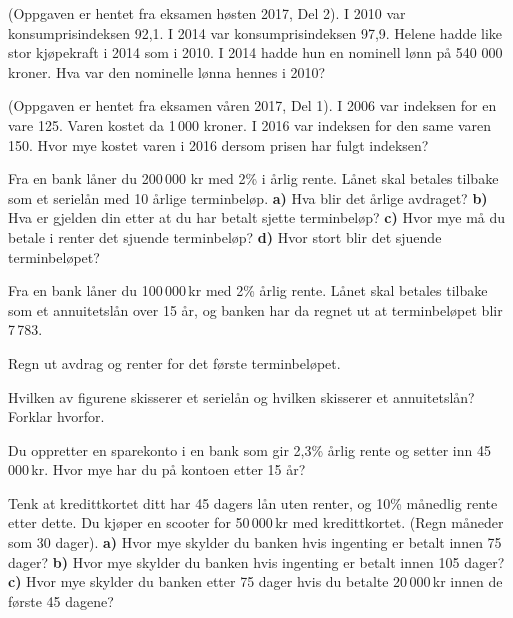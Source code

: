 (Oppgaven er hentet fra eksamen høsten 2017, Del 2).\os
I 2010 var konsumprisindeksen 92,1. I 2014 var konsumprisindeksen 97,9.
Helene hadde like stor kjøpekraft i 2014 som i 2010.
I 2014 hadde hun en nominell lønn på 540 000 kroner.
Hva var den nominelle lønna hennes i 2010?


(Oppgaven er hentet fra eksamen våren 2017, Del 1).\os
I 2006 var indeksen for en vare 125. Varen kostet da 1\,000 kroner. I 2016 var indeksen for den same varen 150.
Hvor mye kostet varen i 2016 dersom prisen har fulgt indeksen?

\nes

Fra en bank låner du 200\,000 kr med 2\% i årlig rente. Lånet skal betales tilbake som et serielån med 10 årlige terminbeløp. \os
\textbf{a)} Hva blir det årlige avdraget?\os
\textbf{b)} Hva er gjelden din etter at du har betalt sjette terminbeløp?\os
\textbf{c)} Hvor mye må du betale i renter det sjuende terminbeløp?\os
\textbf{d)} Hvor stort blir det sjuende terminbeløpet?\os 

Fra en bank låner du 100\,000\,kr med 2\% årlig rente. Lånet skal betales tilbake som et annuitetslån over 15 år, og banken har da regnet ut at terminbeløpet blir 7\,783.\os

Regn ut avdrag og renter for det første terminbeløpet.

Hvilken av figurene skisserer et serielån og hvilken skisserer et annuitetslån? Forklar hvorfor.
\begin{figure}	\centering
	\;
\end{figure}

Du oppretter en sparekonto i en bank som gir 2,3\% årlig rente og setter inn 45\,000\,kr. Hvor mye har du på kontoen etter 15 år?

Tenk at kredittkortet ditt har 45 dagers lån uten renter, og 10\% månedlig rente etter dette. Du kjøper en scooter for 50\,000\,kr med kredittkortet. (Regn måneder som 30 dager).\os
\textbf{a)} Hvor mye skylder du banken hvis ingenting er betalt innen 75 dager?\os
\textbf{b)} Hvor mye skylder du banken hvis ingenting er betalt innen 105 dager?\os 
\textbf{c)} Hvor mye skylder du banken etter 75 dager hvis du betalte 20\,000\,kr innen de første 45 dagene?

